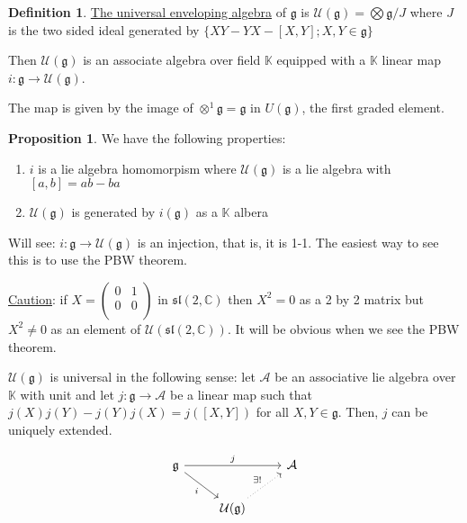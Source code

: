 \documentclass{article}
\theoremstyle{definition}
\newtheorem{definition}{Definition}
\newtheorem{proposition}{Proposition}
\begin{document}
\begin{definition}
    \underline{The universal enveloping algebra} of \(\mathfrak{g} \) is \(\mathcal{U}(\mathfrak{g}) = \bigotimes \mathfrak{g} / J \) where \(J\) is the two sided ideal generated by \(\{ XY - YX - [X,Y] ; X,Y\in \mathfrak{g} \} \)  
\end{definition}

Then \(\mathcal{U} (\mathfrak{g} )\) is an associate algebra over field \(\mathbb{K}\) equipped with a \(\mathbb{K} \) linear map \(i:\mathfrak{g} \to \mathcal{U} (\mathfrak{g})\).

The map is given by the image of \(\otimes^1 \mathfrak{g} = \mathfrak{g} \) in \(U(\mathfrak{g})\), the first graded element.

\begin{proposition}
    We have the following properties:

    \begin{enumerate}
        \item \(i\) is a lie algebra homomorpism where \(\mathcal{U} (\mathfrak{g})\) is a lie algebra with \([a,b]=ab - ba\) 
        \item \(\mathcal{U} (\mathfrak{g} )\) is generated by \(i(\mathfrak{g})\) as a \(\mathbb{K} \) albera
    \end{enumerate}
\end{proposition}

Will see: \(i:\mathfrak{g} \to \mathcal{U} (\mathfrak{g} ) \) is an injection, that is, it is 1-1. The easiest way to see this is to use the PBW theorem.

\underline{Caution}: if \(X = \begin{pmatrix}
    0 &  1 \\
    0 &  0 \\
\end{pmatrix}\) in \(\mathfrak{sl} (2,\mathbb{C})\) then \(X^2 = 0\) as a 2 by 2 matrix but \(X^2 \neq 0\) as an element of \(\mathcal{U} (\mathfrak{sl} (2,\mathbb{C}))\). It will be obvious when we see the PBW theorem.

\(\mathcal{U} (\mathfrak{g} )\) is universal in the following sense: let \(\mathcal{A}\) be an associative lie algebra over \(\mathbb{K} \) with unit and let \(j:\mathfrak{g} \to \mathcal{A} \) be a linear map such that \(j(X)j(Y)-j(Y)j(X)=j([X,Y])\) for all \(X,Y\in \mathfrak{g} \). Then, \(j\) can be uniquely extended.

\[
    \begin{tikzcd}
        \mathfrak{g} \ar[rd,"i",swap] \ar[rr,"j"] & & \mathcal{A}\\
        & \mathcal{U}(\mathfrak{g}) \ar[ur,dotted, "\exists !"] 
    \end{tikzcd}
\]
\end{document}
